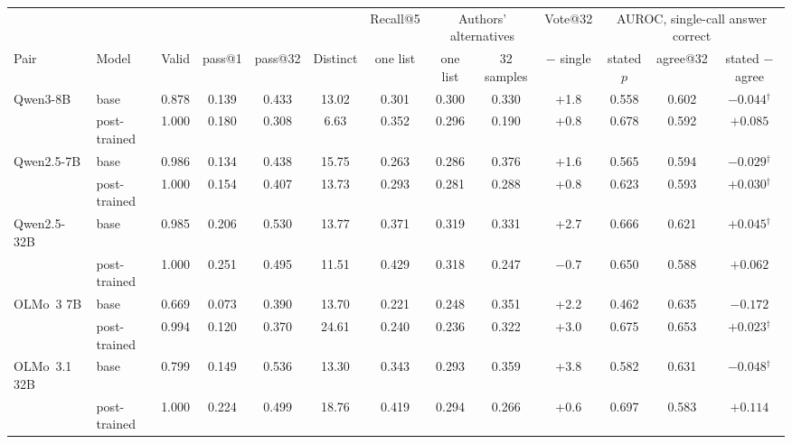 \documentclass[wcp]{jmlr}
\begin{document}
\begin{table}[t]
\centering\small
\begin{adjustbox}{max width=\linewidth}
\begin{tabular}{llccccccccccc}
\toprule
 & & & & & & Recall@5 & \multicolumn{2}{c}{Authors' alternatives} & Vote@32 & \multicolumn{3}{c}{AUROC, single-call answer correct} \\
Pair & Model & Valid & pass@1 & pass@32 & Distinct & one list & one list & 32 samples & $-$ single & stated $p$ & agree@32 & stated $-$ agree \\
\midrule
Qwen3-8B & base & 0.878 & 0.139 & 0.433 & 13.02 & 0.301 & 0.300 & 0.330 & +1.8 & 0.558 & 0.602 & $-0.044$$^{\dagger}$ \\
 & post-trained & 1.000 & 0.180 & 0.308 & 6.63 & 0.352 & 0.296 & 0.190 & +0.8 & 0.678 & 0.592 & $+0.085$ \\
Qwen2.5-7B & base & 0.986 & 0.134 & 0.438 & 15.75 & 0.263 & 0.286 & 0.376 & +1.6 & 0.565 & 0.594 & $-0.029$$^{\dagger}$ \\
 & post-trained & 1.000 & 0.154 & 0.407 & 13.73 & 0.293 & 0.281 & 0.288 & +0.8 & 0.623 & 0.593 & $+0.030$$^{\dagger}$ \\
Qwen2.5-32B & base & 0.985 & 0.206 & 0.530 & 13.77 & 0.371 & 0.319 & 0.331 & +2.7 & 0.666 & 0.621 & $+0.045$$^{\dagger}$ \\
 & post-trained & 1.000 & 0.251 & 0.495 & 11.51 & 0.429 & 0.318 & 0.247 & $-0.7$ & 0.650 & 0.588 & $+0.062$ \\
OLMo~3 7B & base & 0.669 & 0.073 & 0.390 & 13.70 & 0.221 & 0.248 & 0.351 & +2.2 & 0.462 & 0.635 & $-0.172$ \\
 & post-trained & 0.994 & 0.120 & 0.370 & 24.61 & 0.240 & 0.236 & 0.322 & +3.0 & 0.675 & 0.653 & $+0.023$$^{\dagger}$ \\
OLMo~3.1 32B & base & 0.799 & 0.149 & 0.536 & 13.30 & 0.343 & 0.293 & 0.359 & +3.8 & 0.582 & 0.631 & $-0.048$$^{\dagger}$ \\
 & post-trained & 1.000 & 0.224 & 0.499 & 18.76 & 0.419 & 0.294 & 0.266 & +0.6 & 0.697 & 0.583 & $+0.114$ \\
\bottomrule
\end{tabular}
\end{adjustbox}


\end{table}
\end{document}
